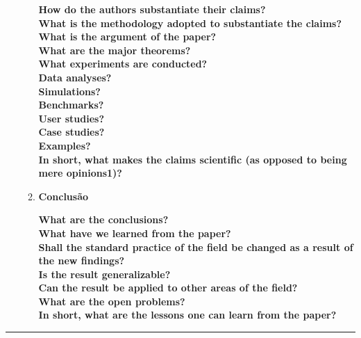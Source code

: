 \begin{enumerate}
\begin{enumerate}[label*=\arabic*.]
    \textbf{How do the authors substantiate their claims?}\\
    \textbf{What is the methodology adopted to substantiate the claims?}\\
    \textbf{What is the argument of the paper?}\\
    \textbf{What are the major theorems?}\\
    \textbf{What experiments are conducted?}\\
    \textbf{Data analyses?}\\
    \textbf{Simulations?\\ Benchmarks?}\\
    \textbf{User studies?}\\
    \textbf{Case studies?}\\
    \textbf{Examples?}\\
    \textbf{In short, what makes the claims scientific (as opposed to being mere opinions1)?}
    \\[6pt]

    \item \textbf{Conclusão}
    
    \textbf{What are the conclusions?}\\
    \textbf{What have we learned from the paper?}\\
    \textbf{Shall the standard practice of the field be changed as a result of the new findings?}\\
    \textbf{Is the result generalizable?}\\
    \textbf{Can the result be applied to other areas of the field?}\\
    \textbf{What are the open problems?}\\
    \textbf{In short, what are the lessons one can learn from the paper?}

\end{enumerate}
\end{enumerate}

\noindent\rule{14.5cm}{0.4pt}